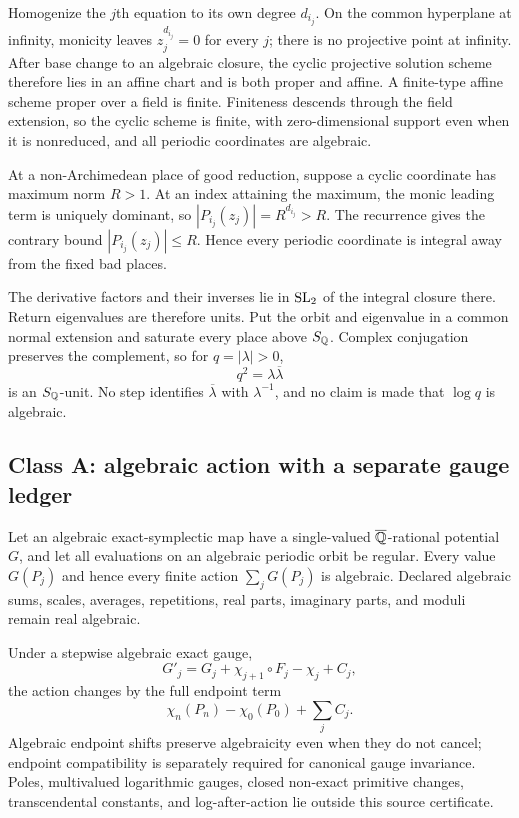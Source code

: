 \documentclass[11pt]{article}
\theoremstyle{definition}
\theoremstyle{remark}
\begin{document}
Homogenize the $j$th equation to its own degree $d_{i_j}$.  On the common
hyperplane at infinity, monicity leaves $z_j^{d_{i_j}}=0$ for every $j$;
there is no projective point at infinity.  After base change to an algebraic
closure, the cyclic projective solution scheme therefore lies in an affine
chart and is both proper and affine.  A finite-type affine scheme proper over
a field is finite.  Finiteness descends through the field extension, so the
cyclic scheme is finite, with zero-dimensional support even when it is
nonreduced, and all periodic coordinates are algebraic.

At a non-Archimedean place of good reduction, suppose a cyclic coordinate has
maximum norm $R>1$.  At an index attaining the maximum, the monic leading
term is uniquely dominant, so
$|P_{i_j}(z_j)|=R^{d_{i_j}}>R$.  The recurrence gives the contrary bound
$|P_{i_j}(z_j)|\leq R$.  Hence every periodic coordinate is integral away
from the fixed bad places.

The derivative factors and their inverses lie in $\operatorname{SL}_2$ of the integral
closure there.  Return eigenvalues are therefore units.  Put the orbit and
eigenvalue in a common normal extension and saturate every place above
$S_{\mathbb Q}$.  Complex conjugation preserves the complement, so for
$q=|\lambda|>0$,
\begin{equation}
 q^2=\lambda\overline\lambda
 \label{eq:modulus-unit}
\end{equation}
is an $S_{\mathbb Q}$-unit.  No step identifies $\overline\lambda$ with
$\lambda^{-1}$, and no claim is made that $\log q$ is algebraic.

\subsection{Class A: algebraic action with a separate gauge ledger}

Let an algebraic exact-symplectic map have a single-valued
$\overline{\mathbb Q}$-rational potential $G$, and let all evaluations on an algebraic
periodic orbit be regular.  Every value $G(P_j)$ and hence every finite
action $\sum_jG(P_j)$ is algebraic.  Declared algebraic sums, scales,
averages, repetitions, real parts, imaginary parts, and moduli remain real
algebraic.

Under a stepwise algebraic exact gauge,
\begin{equation}
 G'_j=G_j+\chi_{j+1}\circ F_j-\chi_j+C_j,
\end{equation}
the action changes by the full endpoint term
\begin{equation}
 \chi_n(P_n)-\chi_0(P_0)+\sum_jC_j.
 \label{eq:gauge}
\end{equation}
Algebraic endpoint shifts preserve algebraicity even when they do not cancel;
endpoint compatibility is separately required for canonical gauge
invariance.  Poles, multivalued logarithmic gauges, closed non-exact
primitive changes, transcendental constants, and log-after-action lie outside
this source certificate.
\end{document}
